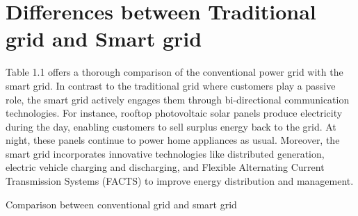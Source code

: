 \section{Differences between Traditional grid and Smart grid }
Table 1.1 offers a thorough comparison of the conventional power grid with the smart grid. In contrast to the traditional grid where customers play a passive role, the smart grid actively engages them through bi-directional communication technologies. For instance, rooftop photovoltaic solar panels produce electricity during the day, enabling customers to sell surplus energy back to the grid. At night, these panels continue to power home appliances as usual. Moreover, the smart grid incorporates innovative technologies like distributed generation, electric vehicle charging and discharging, and Flexible Alternating Current Transmission Systems (FACTS) to improve energy distribution and management.\cite{zhang2014smart}
\begin{table}[h]
  
	\caption{Comparison between conventional grid and smart grid \cite{miller2008understanding}}
    
	\label{tab:my_label}
	\end{table}

